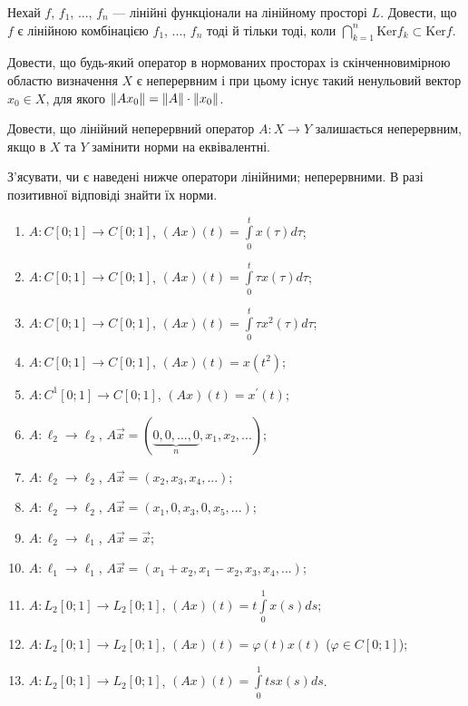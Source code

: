 \begin{exercise}\label{N:1_1_9}
    Нехай $f$, $f_1$, ..., $f_n$ --- лінійні функціонали на лінійному просторі $L$. 
    Довести, що $f$ є лінійною комбінацією $f_1$, ..., $f_n$ тоді й тільки тоді, 
    коли $\bigcap\limits_{k=1}^n \mathrm{Ker} f_k \subset \mathrm{Ker} f$.
\end{exercise}

\begin{exercise}
    Довести, що будь-який оператор в нормованих просторах із скінченновимірною областю 
    визначення $X$ є неперервним і при цьому існує такий ненульовий вектор $x_0 \in X$, 
    для якого $\left\lVert Ax_0\right\rVert = \left\lVert A\right\rVert\cdot\left\lVert x_0\right\rVert$.
\end{exercise}

\begin{exercise}
    Довести, що лінійний неперервний оператор $A: X \rightarrow Y$ залишається неперервним, 
    якщо в $X$ та $Y$ замінити норми на еквівалентні.
\end{exercise}

\begin{exercise}\label{N:1_1_12}
    З'ясувати, чи є наведені нижче оператори лінійними; 
    неперервними. В разі позитивної відповіді знайти їх норми.
    \begin{enumerate}[label=\ukr*)]
        \item $A: C[0; 1] \rightarrow C[0; 1]$, $(Ax)(t) = \int\limits_0^t x(\tau) d\tau$;
        \item $A: C[0; 1] \rightarrow C[0; 1]$, $(Ax)(t) = \int\limits_0^t \tau x(\tau) d\tau$;
        \item $A: C[0; 1] \rightarrow C[0; 1]$, $(Ax)(t) = \int\limits_0^t \tau x^2(\tau) d\tau$;
        \item $A: C[0; 1] \rightarrow C[0; 1]$, $(Ax)(t) = x(t^2)$;
        \item $A: C^1[0; 1] \rightarrow C[0; 1]$, $(Ax)(t) = x^\prime (t)$; 
        \item $A: \ell_2 \rightarrow \ell_2$, $A\vec{x} = (\underbrace{0,0,...,0}_n,
        x_1,x_2,...)$;
        \item $A: \ell_2 \rightarrow \ell_2$, $A\vec{x} = (x_2,x_3,x_4,...)$;
        \item $A: \ell_2 \rightarrow \ell_2$, $A\vec{x} = (x_1,0,x_3,0,x_5,...)$;
        \item $A: \ell_2 \rightarrow \ell_1$, $A\vec{x} = \vec{x}$;
        \item $A: \ell_1 \rightarrow \ell_1$, $A\vec{x} = (x_1+x_2, x_1-x_2, x_3, x_4, ...)$;
        \item $A: L_2[0; 1] \rightarrow L_2[0; 1]$, $(Ax)(t) = t \int\limits_0^1 x(s)ds$;
        \item $A: L_2[0; 1] \rightarrow L_2[0; 1]$, $(Ax)(t) = \varphi(t)x(t)$ 
        ($\varphi \in C[0;1]$);
        \item $A: L_2[0; 1] \rightarrow L_2[0; 1]$, $(Ax)(t) = \int\limits_0^1 tsx(s)ds$.
    \end{enumerate}
\end{exercise}